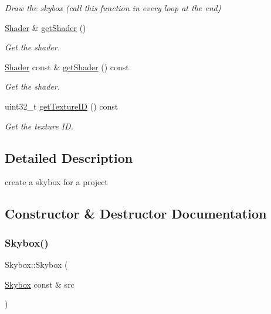 \begin{DoxyCompactItemize}
\begin{DoxyCompactList}\small\item\em Draw the skybox (call this function in every loop at the end) \end{DoxyCompactList}\item 
\hyperlink{class_shader}{Shader} \& \hyperlink{class_skybox_aeeb4151675a4021c3fdfca1e31d33a76}{get\+Shader} ()
\begin{DoxyCompactList}\small\item\em Get the shader. \end{DoxyCompactList}\item 
\hyperlink{class_shader}{Shader} const  \& \hyperlink{class_skybox_a1df309652975013036b534a9e9e11bc2}{get\+Shader} () const
\begin{DoxyCompactList}\small\item\em Get the shader. \end{DoxyCompactList}\item 
uint32\+\_\+t \hyperlink{class_skybox_a4325d2aaa63fafa4b164fd207b185b12}{get\+Texture\+ID} () const
\begin{DoxyCompactList}\small\item\em Get the texture ID. \end{DoxyCompactList}\end{DoxyCompactItemize}


\subsection{Detailed Description}
create a skybox for a project 

\subsection{Constructor \& Destructor Documentation}
\mbox{\label{class_skybox_a2e839335759ec65f6bc7b0c4d5d294b2}} 
\subsubsection{\texorpdfstring{Skybox()}{Skybox()}}
{\footnotesize\ttfamily Skybox\+::\+Skybox (\begin{DoxyParamCaption}\item[{\hyperlink{class_skybox}{Skybox} const \&}]{src }\end{DoxyParamCaption})}



